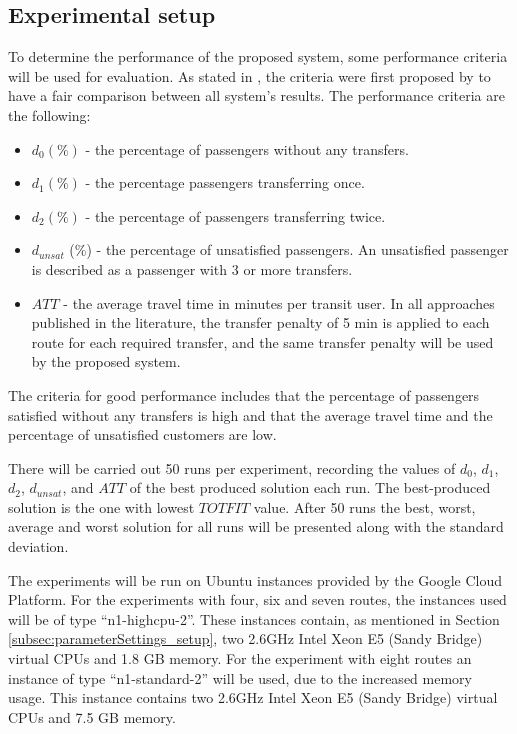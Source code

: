 \subsection{Experimental setup}
\label{subsec:performanceComparison_setup}
To determine the performance of the proposed system, some performance criteria will be used for evaluation. As stated in \citet{kechagiopoulos14}, the criteria were first proposed by \citet{chakroborty02} to have a fair comparison between all system's results. The performance criteria are the following:
\begin{itemize}
\item $d_0 (\%)$ - the percentage of passengers without any transfers. 
\item $d_1 (\%)$ - the percentage passengers transferring once. 
\item $d_2 (\%)$ - the percentage of passengers transferring twice. 
\item $d_{unsat}$ (\%) - the percentage of unsatisfied passengers. An unsatisfied passenger is described as a passenger with 3 or more transfers. 
\item $ATT$  - the average travel time in minutes per transit user. In all approaches published in the literature, the transfer penalty of 5 min is applied to each route for each required transfer, and the same transfer penalty will be used by the proposed system.
\end{itemize}
The criteria for good performance includes that the percentage of passengers satisfied without any transfers is high and that the average travel time and the percentage of unsatisfied customers are low. 

There will be carried out 50 runs per experiment, recording the values of $d_0$, $d_1$, $d_2$, $d_{unsat}$, and $ATT$ of the best produced solution each run. The best-produced solution is the one with lowest $TOTFIT$ value. After 50 runs the best, worst, average and worst solution for all runs will be presented along with the standard deviation. %

The experiments will be run on Ubuntu instances provided by the Google Cloud Platform\citep{website:google}. For the experiments with four, six and seven routes, the instances used will be of type ``n1-highcpu-2''. These instances contain, as mentioned in Section \vref{subsec:parameterSettings_setup}, two 2.6GHz Intel Xeon E5 (Sandy Bridge) virtual CPUs and 1.8 GB memory. For the experiment with eight routes an instance of type ``n1-standard-2'' will be used, due to the increased memory usage. This instance contains two 2.6GHz Intel Xeon E5 (Sandy Bridge) virtual CPUs and 7.5 GB memory.

